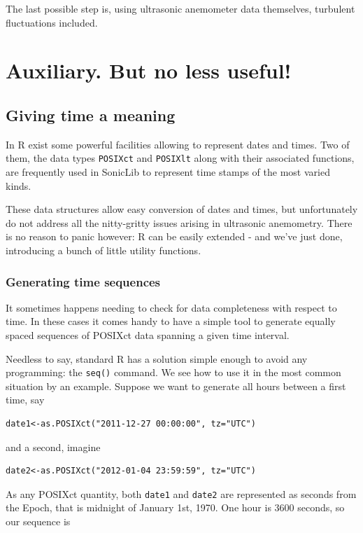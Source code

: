 \documentclass[a4paper,10pt]{book}
\begin{document}
The last possible step is, using ultrasonic anemometer data themselves, turbulent fluctuations included.

\chapter{Auxiliary. But no less useful!}
\section{Giving time a meaning}

In R exist some powerful facilities allowing to represent dates and times. Two of them, the data types \verb|POSIXct| and \verb|POSIXlt| along with their associated functions, are frequently used in SonicLib to represent time stamps of the most varied kinds.

These data structures allow easy conversion of dates and times, but unfortunately do not address all the nitty-gritty issues arising in ultrasonic anemometry. There is no reason to panic however: R can be easily extended - and we've just done, introducing a bunch of little utility functions.

\subsection{Generating time sequences}

It sometimes happens needing to check for data completeness with respect to time. In these cases it comes handy to have a simple tool to generate equally spaced sequences of POSIXct data spanning a given time interval.

Needless to say, standard R has a solution simple enough to avoid any programming: the \verb|seq()| command. We see how to use it in the most common situation by an example. Suppose we want to generate all hours between a first time, say

\begin{verbatim}
date1<-as.POSIXct("2011-12-27 00:00:00", tz="UTC")
\end{verbatim}

\noindent and a second, imagine

\begin{verbatim}
date2<-as.POSIXct("2012-01-04 23:59:59", tz="UTC")
\end{verbatim}

As any POSIXct quantity, both \verb|date1| and \verb|date2| are represented as seconds from the Epoch, that is midnight of January 1st, 1970. One hour is 3600 seconds, so our sequence is
\end{document}

